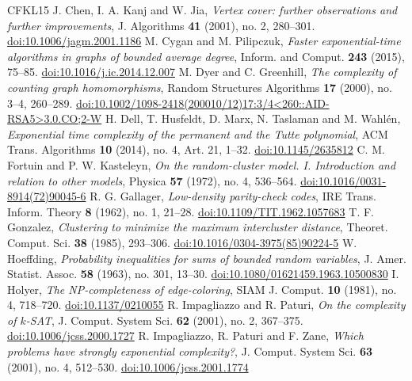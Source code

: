 \documentclass[11pt,reqno]{amsart}
\numberwithin{equation}{section}
\theoremstyle{plain}
\theoremstyle{definition}
\theoremstyle{remark}
\begin{document}
\begin{thebibliography}{CFKL15}
 J. Chen, I. A. Kanj and W. Jia, \emph{Vertex cover: further observations and further improvements}, J. Algorithms \textbf{41} (2001), no. 2, 280--301. \href{https://doi.org/10.1006/jagm.2001.1186}{doi:10.1006/jagm.2001.1186}
 M. Cygan and M. Pilipczuk, \emph{Faster exponential-time algorithms in graphs of bounded average degree}, Inform. and Comput. \textbf{243} (2015), 75--85. \href{https://doi.org/10.1016/j.ic.2014.12.007}{doi:10.1016/j.ic.2014.12.007}
 M. Dyer and C. Greenhill, \emph{The complexity of counting graph homomorphisms}, Random Structures Algorithms \textbf{17} (2000), no. 3--4, 260--289. \href{https://doi.org/10.1002/1098-2418(200010/12)17:3/4<260::AID-RSA5>3.0.CO;2-W}{doi:10.1002/1098-2418(200010/12)17:3/4<260::AID-RSA5>3.0.CO;2-W}
 H. Dell, T. Husfeldt, D. Marx, N. Taslaman and M. Wahl\'en, \emph{Exponential time complexity of the permanent and the Tutte polynomial}, ACM Trans. Algorithms \textbf{10} (2014), no. 4, Art. 21, 1--32. \href{https://doi.org/10.1145/2635812}{doi:10.1145/2635812}
 C. M. Fortuin and P. W. Kasteleyn, \emph{On the random-cluster model. I. Introduction and relation to other models}, Physica \textbf{57} (1972), no. 4, 536--564. \href{https://doi.org/10.1016/0031-8914(72)90045-6}{doi:10.1016/0031-8914(72)90045-6}
 R. G. Gallager, \emph{Low-density parity-check codes}, IRE Trans. Inform. Theory \textbf{8} (1962), no. 1, 21--28. \href{https://doi.org/10.1109/TIT.1962.1057683}{doi:10.1109/TIT.1962.1057683}
 T. F. Gonzalez, \emph{Clustering to minimize the maximum intercluster distance}, Theoret. Comput. Sci. \textbf{38} (1985), 293--306. \href{https://doi.org/10.1016/0304-3975(85)90224-5}{doi:10.1016/0304-3975(85)90224-5}
 W. Hoeffding, \emph{Probability inequalities for sums of bounded random variables}, J. Amer. Statist. Assoc. \textbf{58} (1963), no. 301, 13--30. \href{https://doi.org/10.1080/01621459.1963.10500830}{doi:10.1080/01621459.1963.10500830}
 I. Holyer, \emph{The NP-completeness of edge-coloring}, SIAM J. Comput. \textbf{10} (1981), no. 4, 718--720. \href{https://doi.org/10.1137/0210055}{doi:10.1137/0210055}
 R. Impagliazzo and R. Paturi, \emph{On the complexity of $k$-SAT}, J. Comput. System Sci. \textbf{62} (2001), no. 2, 367--375. \href{https://doi.org/10.1006/jcss.2000.1727}{doi:10.1006/jcss.2000.1727}
 R. Impagliazzo, R. Paturi and F. Zane, \emph{Which problems have strongly exponential complexity?}, J. Comput. System Sci. \textbf{63} (2001), no. 4, 512--530. \href{https://doi.org/10.1006/jcss.2001.1774}{doi:10.1006/jcss.2001.1774}

\end{thebibliography}
\end{document}
